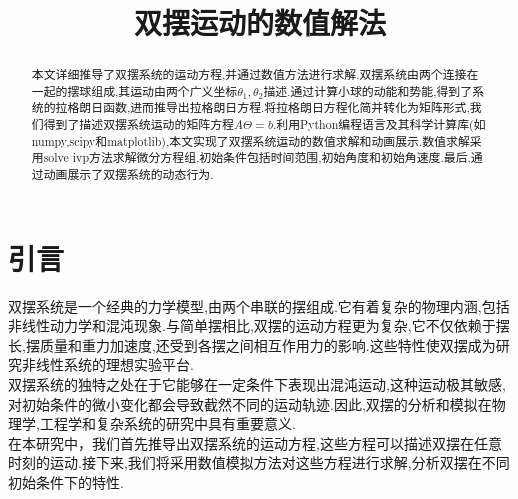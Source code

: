 \documentclass{report}
\title{双摆运动的数值解法}
\begin{document}
\maketitle
\begin{abstract}
本文详细推导了双摆系统的运动方程,并通过数值方法进行求解.双摆系统由两个连接在一起的摆球组成,其运动由两个广义坐标$\theta_1,\theta_2$描述.通过计算小球的动能和势能,得到了系统的拉格朗日函数,进而推导出拉格朗日方程.将拉格朗日方程化简并转化为矩阵形式,我们得到了描述双摆系统运动的矩阵方程$A\Theta=b$.利用Python编程语言及其科学计算库(如numpy,scipy和matplotlib),本文实现了双摆系统运动的数值求解和动画展示.数值求解采用solve ivp方法求解微分方程组,初始条件包括时间范围,初始角度和初始角速度.最后,通过动画展示了双摆系统的动态行为.
\end{abstract}
\chapter{引言}
双摆系统是一个经典的力学模型,由两个串联的摆组成.它有着复杂的物理内涵,包括非线性动力学和混沌现象.与简单摆相比,双摆的运动方程更为复杂,它不仅依赖于摆长,摆质量和重力加速度,还受到各摆之间相互作用力的影响.这些特性使双摆成为研究非线性系统的理想实验平台.\\
双摆系统的独特之处在于它能够在一定条件下表现出混沌运动,这种运动极其敏感,对初始条件的微小变化都会导致截然不同的运动轨迹.因此,双摆的分析和模拟在物理学,工程学和复杂系统的研究中具有重要意义.\\
在本研究中，我们首先推导出双摆系统的运动方程,这些方程可以描述双摆在任意时刻的运动.接下来,我们将采用数值模拟方法对这些方程进行求解,分析双摆在不同初始条件下的特性.
\end{document}
